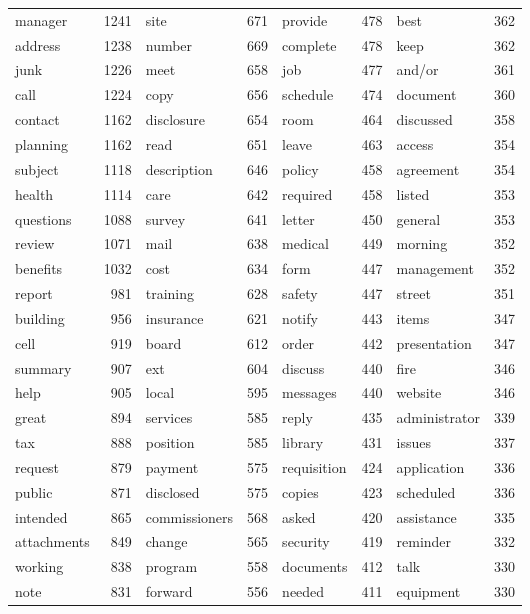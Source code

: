 \documentclass{pnastwo}
\begin{document}
\begin{article}
\begin{table*}
\begin{tabular}{lr|lr|lr|lr}
  \cellcolor{lred} manager & 1241 & site & 671 & provide & 478 & best & 362 \\ 
   address & 1238 & number & 669 & complete & 478 & keep & 362 \\ 
  \cellcolor{lred} junk & 1226 & meet & 658 & job & 477 & \cellcolor{lred} and/or & 361 \\ 
   call & 1224 & copy & 656 & schedule & 474 & document & 360 \\ 
   contact & 1162 & disclosure & 654 & room & 464 & discussed & 358 \\ 
   planning & 1162 & read & 651 & leave & 463 & access & 354 \\ 
   subject & 1118 & description & 646 & policy & 458 & agreement & 354 \\ 
   health & 1114 & care & 642 & required & 458 & listed & 353 \\ 
   questions & 1088 & survey & 641 & letter & 450 & general & 353 \\ 
   review & 1071 & mail & 638 & medical & 449 & morning & 352 \\ 
   benefits & 1032 & cost & 634 & form & 447 & management & 352 \\ 
   report &  981 & training & 628 & safety & 447 & street & 351 \\ 
   building &  956 & insurance & 621 & notify & 443 & items & 347 \\ 
  \cellcolor{lred} cell &  919 & board & 612 & order & 442 & presentation & 347 \\ 
   summary &  907 & \cellcolor{lred} ext & 604 & discuss & 440 & fire & 346 \\ 
   help &  905 & local & 595 & messages & 440 & website & 346 \\ 
   great &  894 & services & 585 & reply & 435 & administrator & 339 \\ 
   tax &  888 & position & 585 & library & 431 & issues & 337 \\ 
   request &  879 & payment & 575 & requisition & 424 & application & 336 \\ 
   public &  871 & disclosed & 575 & copies & 423 & scheduled & 336 \\ 
   intended &  865 & commissioners & 568 & asked & 420 & assistance & 335 \\ 
   attachments &  849 & change & 565 & security & 419 & reminder & 332 \\ 
   working &  838 & program & 558 & documents & 412 & talk & 330 \\ 
   note &  831 & forward & 556 & needed & 411 & equipment & 330 \\ 

\end{tabular}
\end{table*}
\end{article}
\end{document}
